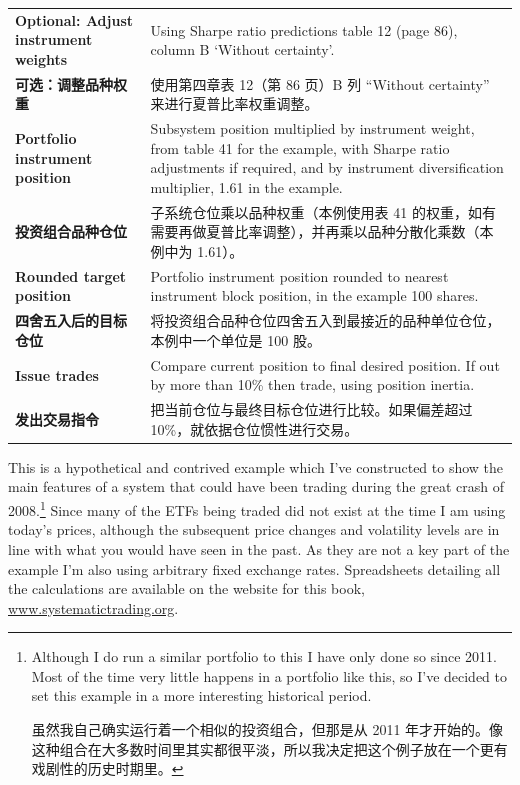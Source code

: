 \begin{bilingualtableblock}
{\begin{tabularx}{\textwidth}{@{} p{} Y@{}}
\textbf{Optional: Adjust instrument weights} & Using Sharpe ratio predictions table 12 (page 86), column B ‘Without certainty'. \\
\textbf{可选：调整品种权重} & 使用第四章表 12（第 86 页）B 列 “Without certainty” 来进行夏普比率权重调整。 \\
\textbf{Portfolio instrument position} & Subsystem position multiplied by instrument weight, from table 41 for the example, with Sharpe ratio adjustments if required, and by instrument diversification multiplier, 1.61 in the example. \\
\textbf{投资组合品种仓位} & 子系统仓位乘以品种权重（本例使用表 41 的权重，如有需要再做夏普比率调整），并再乘以品种分散化乘数（本例中为 1.61）。 \\
\textbf{Rounded target position} & Portfolio instrument position rounded to nearest instrument block position, in the example 100 shares. \\
\textbf{四舍五入后的目标仓位} & 将投资组合品种仓位四舍五入到最接近的品种单位仓位，本例中一个单位是 100 股。 \\
\textbf{Issue trades} & Compare current position to final desired position. If out by more than 10\% then trade, using position inertia. \\
\textbf{发出交易指令} & 把当前仓位与最终目标仓位进行比较。如果偏差超过 10\%，就依据仓位惯性进行交易。 \\
\end{tabularx}
}
\end{bilingualtableblock}


\begin{englishblock} This is a hypothetical and contrived example which I've constructed to show the main features of a system that could have been trading during the great crash of 2008.\footnote{Although I do run a similar portfolio to this I have only done so since 2011. Most of the time very little happens in a portfolio like this, so I've decided to set this example in a more interesting historical period. \par 虽然我自己确实运行着一个相似的投资组合，但那是从 2011 年才开始的。像这种组合在大多数时间里其实都很平淡，所以我决定把这个例子放在一个更有戏剧性的历史时期里。} Since many of the ETFs being traded did not exist at the time I am using today's prices, although the subsequent price changes and volatility levels are in line with what you would have seen in the past. As they are not a key part of the example I'm also using arbitrary fixed exchange rates. Spreadsheets detailing all the calculations are available on the website for this book, \url{www.systematictrading.org}. \end{englishblock}

